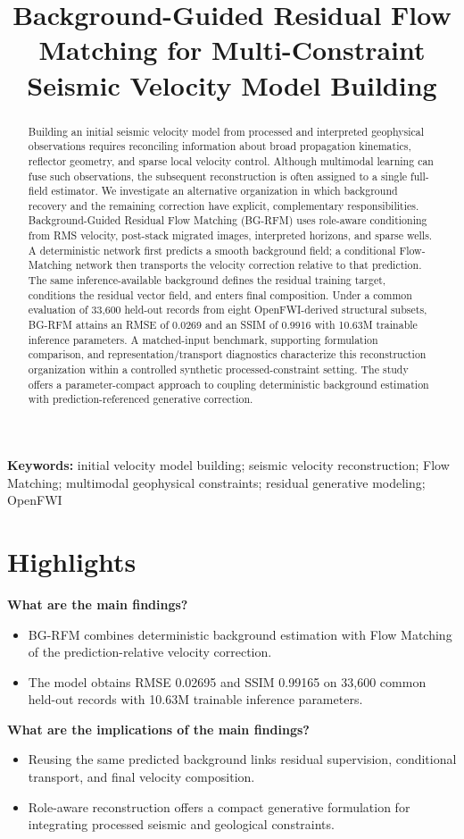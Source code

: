 \documentclass[11pt]{article}
\title{Background-Guided Residual Flow Matching for Multi-Constraint Seismic Velocity Model Building}
\date{}
\begin{document}
\maketitle

\begin{abstract}
Building an initial seismic velocity model from processed and interpreted geophysical observations requires reconciling information about broad propagation kinematics, reflector geometry, and sparse local velocity control. Although multimodal learning can fuse such observations, the subsequent reconstruction is often assigned to a single full-field estimator. We investigate an alternative organization in which background recovery and the remaining correction have explicit, complementary responsibilities. Background-Guided Residual Flow Matching (BG-RFM) uses role-aware conditioning from RMS velocity, post-stack migrated images, interpreted horizons, and sparse wells. A deterministic network first predicts a smooth background field; a conditional Flow-Matching network then transports the velocity correction relative to that prediction. The same inference-available background defines the residual training target, conditions the residual vector field, and enters final composition. Under a common evaluation of 33,600 held-out records from eight OpenFWI-derived structural subsets, BG-RFM attains an RMSE of 0.0269 and an SSIM of 0.9916 with 10.63M trainable inference parameters. A matched-input benchmark, supporting formulation comparison, and representation/transport diagnostics characterize this reconstruction organization within a controlled synthetic processed-constraint setting. The study offers a parameter-compact approach to coupling deterministic background estimation with prediction-referenced generative correction.
\end{abstract}

\noindent\textbf{Keywords:} initial velocity model building; seismic velocity reconstruction; Flow Matching; multimodal geophysical constraints; residual generative modeling; OpenFWI

\section*{Highlights}
\noindent\textbf{What are the main findings?}
\begin{itemize}
    \item BG-RFM combines deterministic background estimation with Flow Matching of the prediction-relative velocity correction.
    \item The model obtains RMSE 0.02695 and SSIM 0.99165 on 33,600 common held-out records with 10.63M trainable inference parameters.
\end{itemize}
\noindent\textbf{What are the implications of the main findings?}
\begin{itemize}
    \item Reusing the same predicted background links residual supervision, conditional transport, and final velocity composition.
    \item Role-aware reconstruction offers a compact generative formulation for integrating processed seismic and geological constraints.
\end{itemize}
\end{document}
